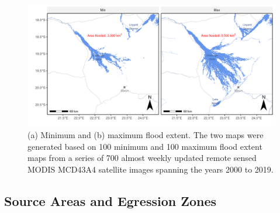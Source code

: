 \documentclass[../FinalThesis.tex]{subfiles}
\begin{document}
\begin{figure}[htpb]
 \begin{center}
  \includegraphics[width = \textwidth]{Figures/FloodExtent.png}
  \caption{(a) Minimum and (b) maximum flood extent. The two maps were generated
  based on 100 minimum and 100 maximum flood extent maps from a series of 700
  almost weekly updated remote sensed MODIS MCD43A4 satellite images spanning
  the years 2000 to 2019.}
  \label{FloodExtent}
 \end{center}
\end{figure}

\subsection{Source Areas and Egression Zones}
\end{document}
